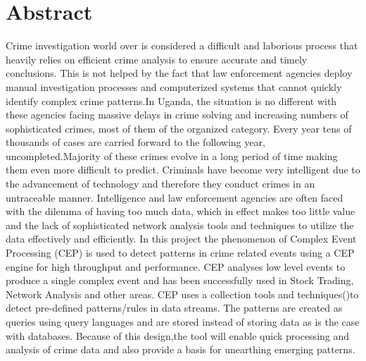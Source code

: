 \newpage
\section*{Abstract}
\noindent Crime investigation world over is considered a difficult and laborious process that heavily relies on efficient crime analysis to ensure accurate and timely conclusions. This is not helped by the fact that law enforcement agencies deploy manual investigation processes and computerized systems that cannot quickly identify complex crime patterns.In Uganda, the situation is no different with these agencies facing massive delays in crime solving and increasing numbers of sophisticated crimes, most of them of the organized category. Every year tens of thousands of cases are carried forward to the following year, uncompleted.Majority of these crimes evolve in a long period of time making them even more difficult to predict. 
\noindent Criminals have become very intelligent due to the advancement of technology and therefore they conduct crimes in an untraceable manner. Intelligence and law enforcement agencies are often faced with the dilemma of having too much data, which in effect makes too little value and the lack of sophisticated network analysis tools and techniques to utilize the data effectively and efficiently. 
\noindent In this project the phenomenon of Complex Event Processing (CEP) is used to detect patterns in crime related events using a CEP engine for high throughput and performance. CEP analyses low level events to produce a single complex event and has been successfully used in Stock Trading, Network Analysis and other areas. CEP uses a collection tools and techniques()to detect pre-defined patterns/rules in data streams. The patterns are created as queries using query languages and are stored instead of storing data as is the case with databases. Because of this design,the tool will enable quick processing and analysis of crime data and also provide a basis for unearthing emerging patterns.
\newline
\pagestyle{plain}
\newpage
\tableofcontents
